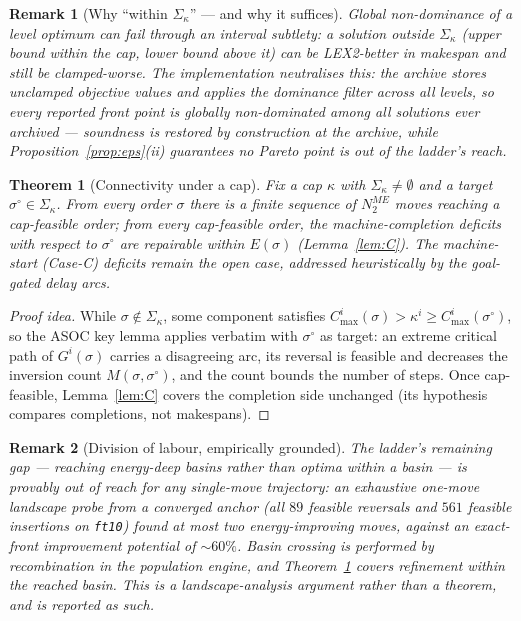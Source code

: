 \documentclass[11pt,a4paper]{article}
\newtheorem{theorem}{Theorem}
\newtheorem{remark}{Remark}
\begin{document}
\begin{remark}[Why ``within $\Sigma_\kappa$'' — and why it suffices]
\label{rem:soundness-scope}
Global non-dominance of a level optimum can fail through an interval
subtlety: a solution outside $\Sigma_\kappa$ (upper bound within the cap,
lower bound above it) can be LEX2-better in makespan and still be
clamped-worse. The implementation neutralises this: the archive stores
\emph{unclamped} objective values and applies the dominance filter across
all levels, so every reported front point is globally non-dominated among
all solutions ever archived — soundness is restored by construction at
the archive, while Proposition~\ref{prop:eps}(ii) guarantees no Pareto
point is out of the ladder's reach.
\end{remark}

\begin{theorem}[Connectivity under a cap]\label{thm:capped-conn}
Fix a cap $\kappa$ with $\Sigma_\kappa\neq\emptyset$ and a target
$\sigma^{\circ}\in\Sigma_\kappa$. From every order $\sigma$ there is a
finite sequence of $N_2^{ME}$ moves reaching a cap-feasible order; from
every cap-feasible order, the machine-completion deficits with respect to
$\sigma^{\circ}$ are repairable within $E(\sigma)$
(Lemma~\ref{lem:C}). The machine-start (Case-C) deficits remain the open
case, addressed heuristically by the goal-gated delay arcs.
\end{theorem}
\begin{proof}[Proof idea]
While $\sigma\notin\Sigma_\kappa$, some component satisfies
$C^i_{\max}(\sigma)>\kappa^i\ge C^i_{\max}(\sigma^{\circ})$, so the ASOC
key lemma applies verbatim with $\sigma^{\circ}$ as target: an extreme
critical path of $G^i(\sigma)$ carries a disagreeing arc, its reversal is
feasible and decreases the inversion count $M(\sigma,\sigma^{\circ})$,
and the count bounds the number of steps. Once cap-feasible,
Lemma~\ref{lem:C} covers the completion side unchanged (its hypothesis
compares completions, not makespans). \end{proof}

\begin{remark}[Division of labour, empirically grounded]
The ladder's remaining gap — reaching energy-deep \emph{basins} rather
than optima within a basin — is provably out of reach for any single-move
trajectory: an exhaustive one-move landscape probe from a converged
anchor (all $89$ feasible reversals and $561$ feasible insertions on
\texttt{ft10}) found at most two energy-improving moves, against an
exact-front improvement potential of ${\sim}60\%$. Basin crossing is
performed by recombination in the population engine, and
Theorem~\ref{thm:capped-conn} covers refinement within the reached
basin. This is a landscape-analysis argument rather than a theorem, and
is reported as such.
\end{remark}
\end{document}
